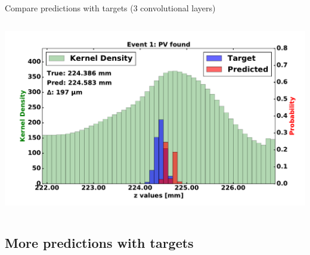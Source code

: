 \begin{frame}{Compare predictions with targets (3 convolutional layers)}
\begin{columns}[c]
\begin{center}
           \includegraphics[width=1\textwidth, height=0.45\textwidth, trim=18 0 18 0]{images/120000_3layer_11.pdf}
       \end{center}
  \end{columns}
\end{frame}

\subsection{More predictions with targets}

